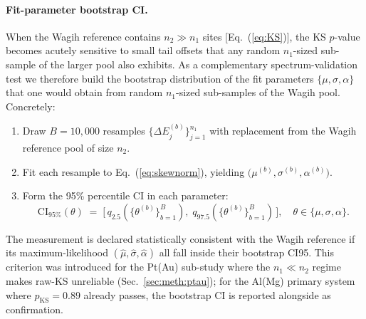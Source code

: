 \paragraph*{Fit-parameter bootstrap CI.}
When the Wagih reference contains $n_2 \gg n_1$ sites
[Eq.~(\ref{eq:KS})], the KS $p$-value becomes acutely sensitive to
small tail offsets that any random $n_1$-sized sub-sample of the
larger pool also exhibits. As a complementary spectrum-validation
test we therefore build the bootstrap distribution of the fit
parameters $\{\mu, \sigma, \alpha\}$ that one would obtain from
random $n_1$-sized sub-samples of the Wagih pool. Concretely:
\begin{enumerate}\itemsep0pt
\item Draw $B = 10{,}000$ resamples
      $\{\Delta E_j^{(b)}\}_{j=1}^{n_1}$ with replacement from the
      Wagih reference pool of size $n_2$.
\item Fit each resample to Eq.~(\ref{eq:skewnorm}), yielding
      $\big(\mu^{(b)}, \sigma^{(b)}, \alpha^{(b)}\big)$.
\item Form the 95\% percentile CI in each parameter:
\begin{equation}\label{eq:fit_bootstrap}
\mathrm{CI}_{95\%}(\theta) \;=\; \Big[\, q_{2.5}\!\left(\{\theta^{(b)}\}_{b=1}^{B}\right), \;
                                              q_{97.5}\!\left(\{\theta^{(b)}\}_{b=1}^{B}\right) \,\Big],
\quad \theta \in \{\mu, \sigma, \alpha\}.
\end{equation}
\end{enumerate}
The measurement is declared statistically consistent with the Wagih
reference if its maximum-likelihood
$(\hat\mu, \hat\sigma, \hat\alpha)$ all fall inside their bootstrap
CI95. This criterion was introduced for the Pt(Au) sub-study where
the $n_1 \ll n_2$ regime makes raw-KS unreliable
(Sec.~\ref{sec:meth:ptau}); for the Al(Mg) primary system where
$p_\mathrm{KS} = 0.89$ already passes, the bootstrap CI is reported
alongside as confirmation.



